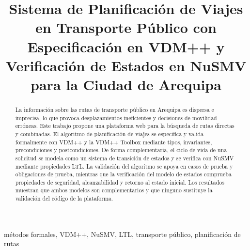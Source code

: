 \documentclass[conference]{IEEEtran}
\begin{document}
\title{Sistema de Planificación de Viajes en Transporte Público con Especificación en VDM++ y Verificación de Estados en NuSMV para la Ciudad de Arequipa}

\author{
}

\maketitle

\begin{abstract}
La información sobre las rutas de transporte público en Arequipa es dispersa e imprecisa, lo que provoca desplazamientos ineficientes y decisiones de movilidad erróneas. Este trabajo propone una plataforma web para la búsqueda de rutas directas y combinadas. El algoritmo de planificación de viajes se especifica y valida formalmente con VDM++ y la VDM++ Toolbox mediante tipos, invariantes, precondiciones y postcondiciones. De forma complementaria, el ciclo de vida de una solicitud se modela como un sistema de transición de estados y se verifica con NuSMV mediante propiedades LTL. La validación del algoritmo se apoya en casos de prueba y obligaciones de prueba, mientras que la verificación del modelo de estados comprueba propiedades de seguridad, alcanzabilidad y retorno al estado inicial. Los resultados muestran que ambos modelos son complementarios y que ninguno sustituye la validación del código de la plataforma.
\end{abstract}

\begin{IEEEkeywords}
métodos formales, VDM++, NuSMV, LTL, transporte público, planificación de rutas
\end{IEEEkeywords}















\end{document}
